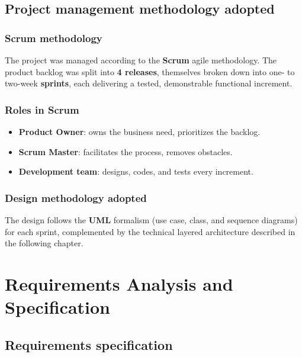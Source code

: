 \documentclass[a4paper,12pt]{report}
\begin{document}
\section{Project management methodology adopted}

\subsection{Scrum methodology}
The project was managed according to the \textbf{Scrum} agile methodology.
The product backlog was split into \textbf{4 releases}, themselves broken
down into one- to two-week \textbf{sprints}, each delivering a tested,
demonstrable functional increment.

\subsection{Roles in Scrum}
\begin{itemize}[leftmargin=*]
  \item \textbf{Product Owner}: owns the business need, prioritizes the
        backlog.
  \item \textbf{Scrum Master}: facilitates the process, removes obstacles.
  \item \textbf{Development team}: designs, codes, and tests every
        increment.
\end{itemize}

\subsection{Design methodology adopted}
The design follows the \textbf{UML} formalism (use case, class, and
sequence diagrams) for each sprint, complemented by the technical
layered architecture described in the following chapter.

\chapter{Requirements Analysis and Specification}

\section{Requirements specification}
\end{document}
